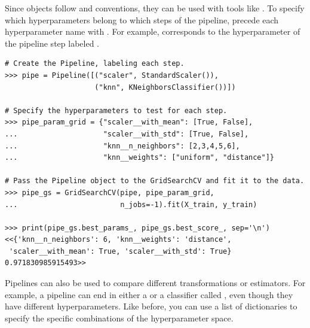 Since  objects follow  and  conventions, they can be used with tools like .
To specify which hyperparameters belong to which steps of the pipeline, precede each hyperparameter name with .
For example,  corresponds to the  hyperparameter of the pipeline step labeled .

\begin{lstlisting}
# Create the Pipeline, labeling each step.
>>> pipe = Pipeline([("scaler", StandardScaler()),
                     ("knn", KNeighborsClassifier())])
                     
# Specify the hyperparameters to test for each step.
>>> pipe_param_grid = {"scaler__with_mean": [True, False],
...                    "scaler__with_std": [True, False],
...                    "knn__n_neighbors": [2,3,4,5,6],
...                    "knn__weights": ["uniform", "distance"]}

# Pass the Pipeline object to the GridSearchCV and fit it to the data.
>>> pipe_gs = GridSearchCV(pipe, pipe_param_grid,
...                        n_jobs=-1).fit(X_train, y_train)

>>> print(pipe_gs.best_params_, pipe_gs.best_score_, sep='\n')
<<{'knn__n_neighbors': 6, 'knn__weights': 'distance',
 'scaler__with_mean': True, 'scaler__with_std': True}
0.971830985915493>>
\end{lstlisting}

Pipelines can also be used to compare different transformations or estimators.
For example, a pipeline can end in either a  or a classifier called , even though they have different hyperparameters.
Like before, you can use a list of dictionaries to specify the specific combinations of the hyperparameter space.

